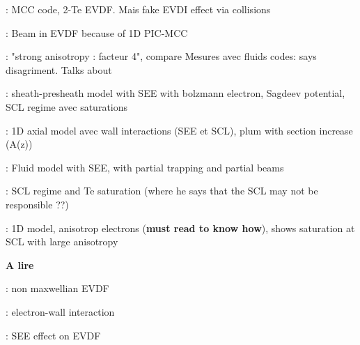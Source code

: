 \citet{smirnov2004} : MCC code, 2-Te EVDF. Mais fake EVDI effect via collisions

\citet{sydorenko2006a} : Beam in EVDF because of 1D PIC-MCC 

\citet{raitses2006} : "strong anisotropy : facteur 4",  compare Mesures avec fluids codes: says disagriment. Talks about 

\citet{ahedo2002} : sheath-presheath model with SEE with bolzmann electron, Sagdeev potential, SCL regime avec saturations 

\citet{ahedo2003} : 1D axial model avec wall interactions (SEE et SCL), plum with section increase (A(z)) 

\citet{ahedo2005} : Fluid model with SEE, with partial trapping and partial beams

\citet{raitses2005} : SCL regime and Te saturation (where he says that the SCL may not be responsible ??)

\citet{barral2003a} : 1D model, anisotrop electrons ({\bf must read to know how}), shows saturation at SCL with large anisotropy

{\bf \Large A lire}

\citet{sydorenko2007} :  non maxwellian EVDF

\citet{raitses2005a} : electron-wall interaction

\citet{jolivet2000} : SEE effect on EVDF 

